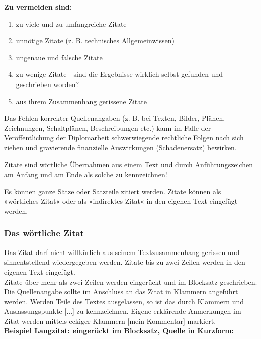 \documentclass[a4paper, 12pt, xcolor=dvipsnames]{scrartcl}	%
\begin{document}
\textbf{Zu vermeiden sind:}
%
\begin{enumerate}
	\linespread {1.0}
	\item zu viele und zu umfangreiche Zitate
	\item unnötige Zitate (z. B. technisches Allgemeinwissen)
	\item ungenaue und falsche Zitate
	\item zu wenige Zitate - sind die Ergebnisse wirklich selbst gefunden und geschrieben worden?
	\item aus ihrem Zusammenhang gerissene Zitate
	\linespread {1.25}
\end{enumerate}

Das Fehlen korrekter Quellenangaben (z. B. bei Texten, Bilder, Plänen, Zeichnungen, Schaltplänen, Beschreibungen etc.)
kann im Falle der Veröffentlichung der Diplomarbeit schwerwiegende rechtliche Folgen nach sich ziehen und gravierende
finanzielle Auswirkungen (Schadenersatz) bewirken.\\

%
\begin{Merksatz}
Zitate sind wörtliche Übernahmen aus einem Text und durch Anführungszeichen am Anfang und am Ende als solche zu kennzeichnen!
\end{Merksatz}
%

Es können ganze Sätze oder Satzteile zitiert werden. Zitate können als »wörtliches Zitat« oder als »indirektes Zitat« in den eigenen Text eingefügt werden.

\subsubsection{Das wörtliche Zitat}										%
Das Zitat darf nicht willkürlich aus seinem Textzusammenhang gerissen und sinnentstellend wiedergegeben werden.
Zitate bis zu zwei Zeilen werden in den eigenen Text eingefügt.\\
Zitate über mehr als zwei Zeilen werden eingerückt und im Blocksatz geschrieben. Die Quellenangabe sollte im Anschluss an das Zitat in Klammern angeführt werden. Werden Teile des Textes ausgelassen, so ist das durch Klammern und Auslassungspunkte [...] zu kennzeichnen. Eigene erklärende Anmerkungen im Zitat werden mittels eckiger Klammern [mein Kommentar] markiert. \\

\textbf{Beispiel Langzitat: eingerückt im Blocksatz, Quelle in Kurzform:}\\	%
\end{document}
